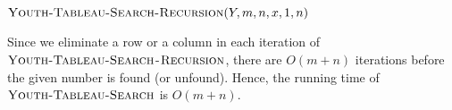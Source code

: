 \documentclass[12pt,reqno]{amsart}
\begin{document}
\begin{enumerate}[1.]
\begin{enumerate}[a.]
    \begin{algorithm}
        \caption{$\textsc{Youth-Tableau-Search}(Y, m, n, x)$}
        \begin{algorithmic}[1]
            \STATE $\textsc{Youth-Tableau-Search-Recursion}(Y, m, n, x, 1, n)$
        \end{algorithmic}
    \end{algorithm}
    \newpage
    Since we eliminate a row or a column in each iteration of $\textsc{Youth-Tableau-Search}$-$\textsc{Recursion}$, there are $O(m + n)$ iterations before the given number is found (or unfound). Hence, the running time of $\textsc{Youth-Tableau-Search}$ is $O(m + n)$.
\end{enumerate}
\vspace{1cm}


\end{enumerate}
\end{document}
